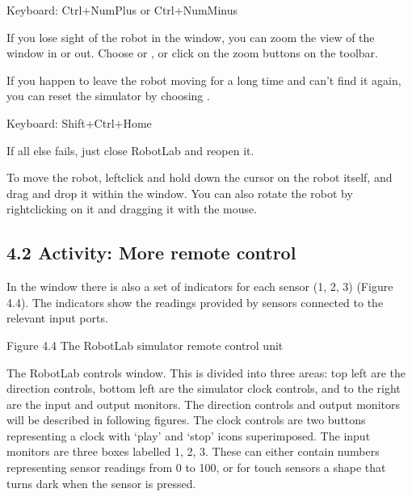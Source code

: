 \documentclass[letterpaper,10pt,english]{sphinxmanual}
\begin{document}
Keyboard: Ctrl+NumPlus or Ctrl+NumMinus





If you lose sight of the robot in the  window, you can zoom the view of the  window in or out. Choose  or , or click on the zoom  buttons on the toolbar.

If you happen to leave the robot moving for a long time and can’t find it again, you can reset the simulator by choosing .





Keyboard: Shift+Ctrl+Home





If all else fails, just close RobotLab and reopen it.

To move the robot, left\sphinxhyphen{}click and hold down the cursor on the robot itself, and drag and drop it within the  window. You can also rotate the robot by right\sphinxhyphen{}clicking on it and dragging it with the mouse.


\subsection{4.2 Activity: More remote control}
\label{\detokenize{content/00_SOFTWARE_GUIDE/Section_00_04_LEGACY_UNUSED_IGNORE:4.2-Activity:-More-remote-control}}
In the  window there is also a set of indicators for each sensor (1, 2, 3) (Figure 4.4). The indicators show the readings provided by sensors connected to the relevant input ports.


Figure 4.4 The RobotLab simulator remote control unit

The RobotLab controls window. This is divided into three areas: top left are the direction controls, bottom left are the simulator clock controls, and to the right are the input and output monitors. The direction controls and output monitors will be described in following figures. The clock controls are two buttons representing a clock with ‘play’ and ‘stop’ icons superimposed. The input monitors are three boxes labelled 1, 2, 3. These can either contain numbers representing sensor readings from
0 to 100, or for touch sensors a shape that turns dark when the sensor is pressed.
\end{document}
